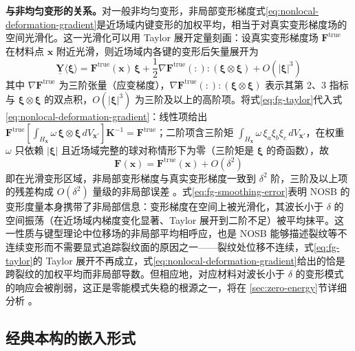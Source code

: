 \textbf{与非均匀变形的关系。}对一般非均匀变形，非局部变形梯度式\eqref{eq:nonlocal-deformation-gradient}是近场域内键变形的加权平均，相当于对真实变形梯度场的空间光滑化。这一光滑化可以用 Taylor 展开定量刻画：设真实变形梯度场 $\mathbf{F}^{\mathrm{true}}$ 在材料点 $\mathbf{x}$ 附近光滑，则近场域内各键的变形后矢量展开为
\begin{equation}
  \underline{\mathbf{Y}}\langle\boldsymbol{\xi}\rangle
  =\mathbf{F}^{\mathrm{true}}(\mathbf{x})\,\boldsymbol{\xi}
  +\frac{1}{2}\nabla\mathbf{F}^{\mathrm{true}}(:):(\boldsymbol{\xi}\otimes\boldsymbol{\xi})
  +O(|\boldsymbol{\xi}|^{3})
  \label{eq:fg-taylor}
\end{equation}
其中 $\nabla\mathbf{F}^{\mathrm{true}}$ 为三阶张量（应变梯度），$\nabla\mathbf{F}^{\mathrm{true}}(:):(\boldsymbol{\xi}\otimes\boldsymbol{\xi})$ 表示其第 2、3 指标与 $\boldsymbol{\xi}\otimes\boldsymbol{\xi}$ 的双点积，$O(|\boldsymbol{\xi}|^{3})$ 为三阶及以上的高阶项。将式\eqref{eq:fg-taylor}代入式\eqref{eq:nonlocal-deformation-gradient}：线性项给出 $\mathbf{F}^{\mathrm{true}}[\int_{H_{\mathbf{x}}}\omega\,\boldsymbol{\xi}\otimes\boldsymbol{\xi}\,dV_{\mathbf{x}'}]\mathbf{K}^{-1}=\mathbf{F}^{\mathrm{true}}$；二阶项含三阶矩 $\int_{H_{\mathbf{x}}}\omega\,\xi_{a}\xi_{b}\xi_{c}\,dV_{\mathbf{x}'}$，在权重 $\omega$ 只依赖 $|\boldsymbol{\xi}|$ 且近场域完整的球对称情形下为零（三阶矩是 $\boldsymbol{\xi}$ 的奇函数），故
\begin{equation}
  \mathbf{F}(\mathbf{x})=\mathbf{F}^{\mathrm{true}}(\mathbf{x})+O(\delta^{2})
  \label{eq:fg-smoothing-error}
\end{equation}
即在光滑变形区域，非局部变形梯度与真实变形梯度一致到 $\delta^{2}$ 阶，三阶及以上项的残差构成 $O(\delta^{2})$ 量级的非局部误差 \cite{SillingLehoucq2010,QueirugaMoridis2017}。式\eqref{eq:fg-smoothing-error}表明 NOSB 的变形度量本身携带了非局部信息：变形梯度在空间上被光滑化，其波长小于 $\delta$ 的空间振荡（在近场域内梯度变化显著、Taylor 展开到二阶不足）被平均抹平。这一性质与键型理论中位移场的非局部平均相呼应，也是 NOSB 能够描述裂纹等不连续变形而不需要显式追踪裂纹面的原因之一——裂纹处位移不连续，式\eqref{eq:fg-taylor}的 Taylor 展开不再成立，式\eqref{eq:nonlocal-deformation-gradient}给出的恰是跨裂纹的加权平均而非局部导数。但相应地，对应材料对波长小于 $\delta$ 的变形模式的响应会被削弱，这正是零能模式失稳的根源之一，将在 \ref{sec:zero-energy}节详细分析 \cite{Silling2017}。

\subsection{经典本构的嵌入形式}\label{sec:constitutive-embedding}

